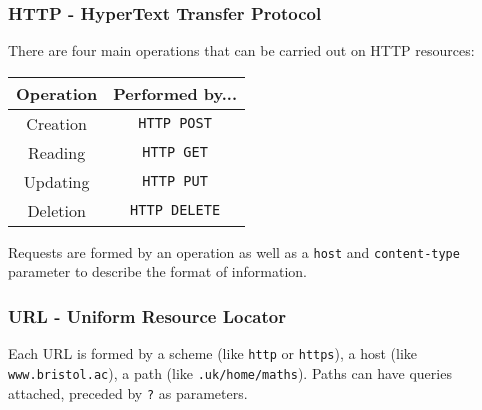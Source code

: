 \subsubsection{HTTP - HyperText Transfer Protocol}

There are four main operations that can be carried out on HTTP resources:
\begin{center}
    \begin{tabular}{ | c | c |}
        \hline
        Operation & Performed by... \\
        \hline \hline
        Creation & \texttt{HTTP POST} \\
        \hline
        Reading  & \texttt{HTTP GET} \\
        \hline
        Updating & \texttt{HTTP PUT} \\
        \hline
        Deletion & \texttt{HTTP DELETE} \\
        \hline
    \end{tabular}
\end{center} Requests are formed by an operation as well as
a \texttt{host} and \texttt{content-type} parameter to describe 
the format of information.

\subsubsection{URL - Uniform Resource Locator}

Each URL is formed by a scheme (like \texttt{http} or \texttt{https}),
a host (like \texttt{www.bristol.ac}), a path (like \texttt{.uk/home/maths}).
Paths can have queries attached, preceded by \texttt{?} as parameters.


